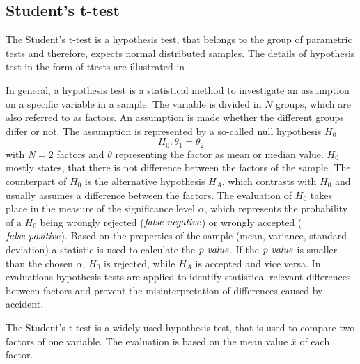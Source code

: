 \subsection{Student's t-test}\label{ord:ch2:sec4:subsec2}

The Student's t-test is a hypothesis test, that belongs to the group of parametric tests and therefore, expects normal distributed samples.
The details of hypothesis test in the form of ttests are illustrated in \cite{Dodge08-Statistics} \cite{FisherBox81-StudentT} \cite{RK06-HypothesisTesting}.

In general, a hypothesis test is a statistical method to investigate an assumption on a specific variable in a sample.
The variable is divided in $N$ groups, which are also referred to as factors.
An assumption is made whether the different groups differ or not.
The assumption is represented by a so-called null hypothesis $H_{0}$
\begin{equation}
	H_{0}: \theta_{1} = \theta_{2}
\end{equation}
with $N=2$ factors and $\theta$ representing the factor as \eg mean or median value.
$H_{0}$ mostly states, that there is not difference between the factors of the sample.
The counterpart of $H_{0}$ is the alternative hypothesis $H_{A}$,
which contrasts with $H_{0}$ and usually assumes a difference between the factors.
The evaluation of $H_{0}$ takes place in the measure of the significance level $\alpha$, which represents the probability of a $H_{0}$ being wrongly rejected ($\textnormal{\textit{false negative}}$) or wrongly accepted ($\textnormal{\textit{false positive}}$).
Based on the properties of the sample (\eg mean, variance, standard deviation) a statistic is used to calculate the $\textnormal{\textit{p-value}}$.
If the $\textnormal{\textit{p-value}}$ is smaller than the chosen $\alpha$, $H_{0}$ is rejected, while $H_{A}$ is accepted and vice versa.
In evaluations hypothesis tests are applied to identify statistical relevant differences between factors and prevent the misinterpretation of differences caused by accident.

The Student's t-test is a widely used hypothesis test, that is used to compare two factors of one variable.
The evaluation is based on the mean value $\overline{x}$ of each factor.


